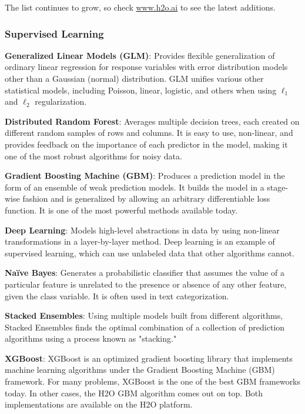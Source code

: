 {\begin{frame}
\begin{tabular}{p{5.0cm}p{6.0cm}}
\end{tabular}

\end{frame}

The list continues to grow, so check \url{www.h2o.ai} to see the latest additions. 

\subsubsection{Supervised Learning}


{\textbf{Generalized Linear Models (GLM)}}: Provides flexible generalization of ordinary linear regression for response variables with error distribution models other than a Gaussian (normal) distribution. GLM unifies various other statistical models, including Poisson, linear, logistic, and others when using $\ell_1$ and $\ell_2$ regularization.

{\textbf{Distributed Random Forest}}: Averages multiple decision trees, each created on different random samples of rows and columns. It is easy to use, non-linear, and provides feedback on the importance of each predictor in the model, making it one of the most robust algorithms for noisy data.

{\textbf{Gradient Boosting Machine (GBM)}}: Produces a prediction model in the form of an ensemble of weak prediction models. It builds the model in a stage-wise fashion and is generalized by allowing an arbitrary differentiable loss function. It is one of the most powerful methods available today.

{\textbf{Deep Learning}}: Models high-level abstractions in data by using non-linear transformations in a layer-by-layer method. Deep learning is an example of supervised learning, which can use unlabeled data that other algorithms cannot.

{\textbf{Na\"{i}ve Bayes}}: Generates a probabilistic classifier that assumes the value of a particular feature is unrelated to the presence or absence of any other feature, given the class variable. It is often used in text categorization.

{\textbf{Stacked Ensembles}}: Using multiple models built from different algorithms, Stacked Ensembles finds the optimal combination of a collection of prediction algorithms using a process known as "stacking."

{\textbf{XGBoost}}: XGBoost is an optimized gradient boosting library that implements machine learning algorithms under the Gradient Boosting Machine (GBM) framework. For many problems, XGBoost is the one of the best GBM frameworks today.  In other cases, the H2O GBM algorithm comes out on top.  Both implementations are available on the H2O platform.

}
